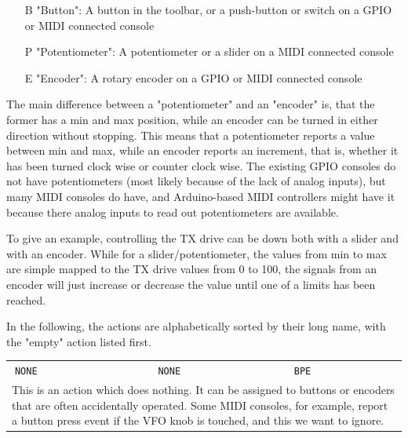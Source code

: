 \documentclass[12pt]{book}
\def\bltt#1{\texttt{\color{blue}#1}}
\begin{document}
\begin{itemize}[font=\texttt, left=0pt]
\item[B] {"Button": A button in the toolbar, or a push-button or switch on a GPIO or MIDI connected console}
\item[P] {"Potentiometer": A potentiometer or a slider on a MIDI connected console}
\item[E] {"Encoder": A rotary encoder on a GPIO or MIDI connected console}
\end{itemize}

The main difference between a "potentiometer" and an "encoder" is, that the former has a min and max
position, while
an encoder can be turned in either direction without stopping. This means that a potentiometer
reports a value between min and max, while an encoder reports an increment,
that is, whether it has been turned clock wise or counter clock wise.
The existing GPIO consoles do not have potentiometers (most likely because of the lack of analog inputs),
but
many MIDI consoles do have, and Arduino-based MIDI controllers might have it because there analog inputs
to read out potentiometers are available.

To give an example, controlling the TX drive can be down both with a slider and with an encoder. While for
a slider/potentiometer, the values from min to max are simple mapped to the TX drive values from 0 to 100,
the signals from an encoder will just increase or decrease the value until one of a limits has been reached.

In the following, the actions are alphabetically sorted by their long name, with the "empty" action listed
first.

\renewcommand{\belowrulesep}{0pt}
\renewcommand{\aboverulesep}{0pt}
\def\action#1#2#3#4{
\begin{center}
\begin{tabular}{|p{7cm}|p{3cm}|p{1cm}|}
\toprule
$\phantom{\Big|}$\bltt{\large #1} & \texttt{\large #2} & \texttt{\large #3} \\\cline{1-3}
\multicolumn{3}{|p{\textwidth}|}{#4} \\
\bottomrule
\end{tabular}
\end{center}
}


\action{NONE}{NONE}{BPE}{This is an action which does nothing. It can be assigned to buttons or enco\-ders
that
are often accidentally operated. Some MIDI consoles, for example, report a button press event if the VFO
knob is touched, and this we want to ignore.}
\end{document}
